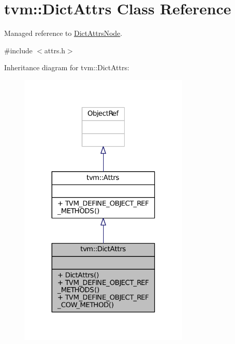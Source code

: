 \hypertarget{classtvm_1_1DictAttrs}{}\section{tvm\+:\+:Dict\+Attrs Class Reference}
\label{classtvm_1_1DictAttrs}


Managed reference to \hyperlink{classtvm_1_1DictAttrsNode}{Dict\+Attrs\+Node}.  




{\ttfamily \#include $<$attrs.\+h$>$}



Inheritance diagram for tvm\+:\+:Dict\+Attrs\+:
\nopagebreak
\begin{figure}[H]
\begin{center}
\leavevmode
\includegraphics[width=230pt]{classtvm_1_1DictAttrs__inherit__graph}
\end{center}
\end{figure}


